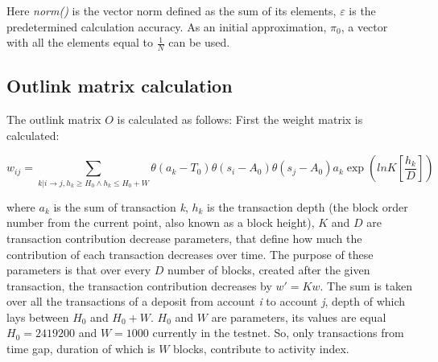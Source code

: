 \documentclass[a4paper,12pt]{article}
\begin{document}
Here \textit{norm()} is the vector norm defined as the sum of its elements, $\varepsilon$ is the predetermined calculation accuracy. As an initial approximation, $\pi_0$, a vector with all the elements equal to $\frac{1}{N}$ can be used.


\subsection{Outlink matrix calculation}

The outlink matrix $O$ is calculated as follows: First the weight matrix is calculated:


$$
w_{ij}=\sum_{k|i \to j, {h_k \ge H_0} \land {h_k \le H_0+W}} \theta ( a_k - T_0 ) \theta ( s_i - A_0 ) \theta ( s_j - A_0 ) a_k \exp{(lnK [\frac{h_k}{D}])}
$$

where $a_k$ is the sum of transaction \textit{k}, $h_k$ is the transaction depth (the block order number from the current point, also known as a block height),  $K$ and $D$ are transaction contribution decrease parameters, that define how much the contribution of each transaction decreases over time. The purpose of these parameters is that over every $D$ number of blocks, created after the given transaction, the transaction contribution decreases by $w'=Kw$. The sum is taken over all the transactions of a deposit from account \textit{i} to account \textit{j}, depth of which lays between $H_0$ and $H_0+W$. $H_0$ and $W$ are parameters, its values are equal $H_0=2419200$ and $W=1000$ currently in the testnet. So, only transactions from time gap, duration of which is $W$ blocks, contribute to activity index.



\end{document}
